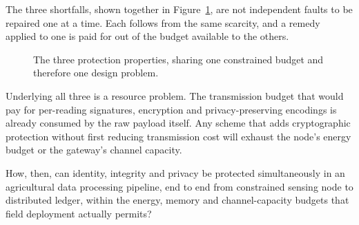 \documentclass[12pt,a4paper,oneside]{book}
\begin{document}
The three shortfalls, shown together in Figure~\ref{fig:three-properties}, are
not independent faults to be repaired one at a time. Each follows from the same
scarcity, and a remedy applied to one is paid for out of the budget available
to the others.

\begin{figure}[htbp]
  \centering
  \caption{The three protection properties, sharing one constrained budget
           and therefore one design problem.}
  \label{fig:three-properties}
\end{figure}

Underlying all three is a resource problem. The transmission budget that would
pay for per-reading signatures, encryption and privacy-preserving encodings is
already consumed by the raw payload itself. Any scheme that adds cryptographic
protection without first reducing transmission cost will exhaust the node's
energy budget or the gateway's channel capacity.

How, then, can identity, integrity and privacy be protected simultaneously in an agricultural data
processing pipeline, end to end from constrained sensing node to distributed
ledger, within the energy, memory and channel-capacity budgets that field
deployment actually permits?
\end{document}
